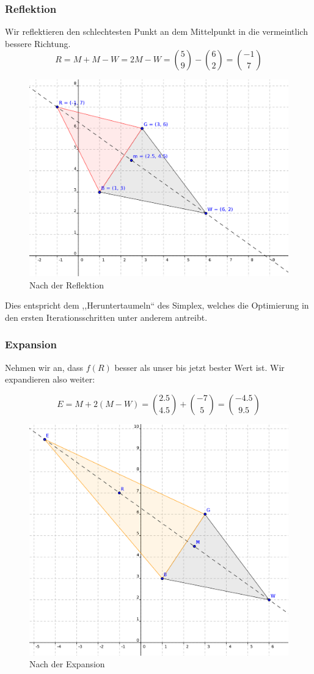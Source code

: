 \documentclass[naustrian]{article}
\begin{document}
\subsubsection{Reflektion}

Wir reflektieren den schlechtesten Punkt an dem Mittelpunkt in die
vermeintlich bessere Richtung.
\[
    R=M+M-W=2M-W=\binom{5}{9}-\binom{6}{2}=\binom{-1}{7}
\]

\begin{figure}[h]
    \centering
    \includegraphics[width=.5\textwidth]{nelder_mead/triangle_reflect}
    \caption{Nach der Reflektion}
\end{figure}

Dies entspricht dem ,,Heruntertaumeln`` des Simplex, welches die
Optimierung in den ersten Iterationsschritten unter anderem antreibt.

\subsubsection{Expansion}

Nehmen wir an, dass $f(R)$ besser als unser bis jetzt bester Wert
ist. Wir expandieren also weiter:

\[
    E=M+2(M-W)=\binom{2.5}{4.5}+\binom{-7}{5}=\binom{-4.5}{9.5}
\]

\begin{figure}[h]
    \centering
    \includegraphics[width=.5\textwidth]{nelder_mead/triangle_expand}
    \caption{Nach der Expansion}
\end{figure}
\end{document}
